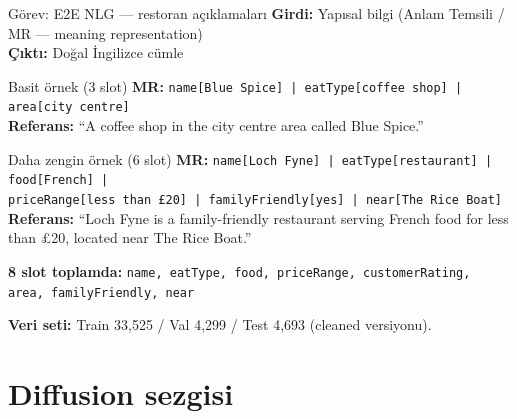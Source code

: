 \documentclass[10pt,aspectratio=169]{beamer}
\begin{document}
\begin{frame}{Görev: E2E NLG --- restoran açıklamaları}
  \textbf{Girdi:} Yapısal bilgi (Anlam Temsili / MR --- meaning representation) \\
  \textbf{Çıktı:} Doğal İngilizce cümle

  \vspace{0.5em}
  \begin{exampleblock}{Basit örnek (3 slot)}
    \footnotesize
    \textbf{MR:} \texttt{name[Blue Spice] | eatType[coffee shop] | area[city centre]} \\[0.3em]
    \textbf{Referans:} ``A coffee shop in the city centre area called Blue Spice.''
  \end{exampleblock}

  \begin{exampleblock}{Daha zengin örnek (6 slot)}
    \scriptsize
    \textbf{MR:} \texttt{name[Loch Fyne] | eatType[restaurant] | food[French] |}\\
    \texttt{priceRange[less than £20] | familyFriendly[yes] | near[The Rice Boat]} \\[0.3em]
    \textbf{Referans:} ``Loch Fyne is a family-friendly restaurant serving French food
    for less than £20, located near The Rice Boat.''
  \end{exampleblock}

  \vspace{0.3em}
  \textbf{8 slot toplamda:} \texttt{name, eatType, food, priceRange, customerRating,
  area, familyFriendly, near}

  \textbf{Veri seti:} Train 33{,}525 / Val 4{,}299 / Test 4{,}693 (cleaned versiyonu).
\end{frame}

\section{Diffusion sezgisi}
\end{document}

